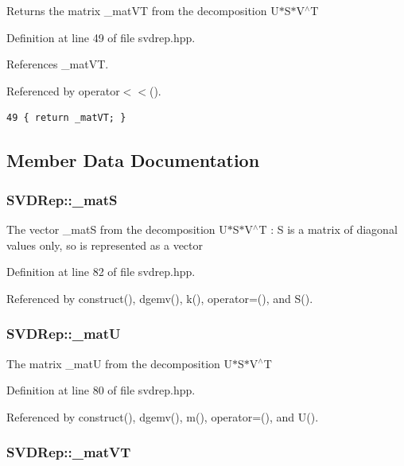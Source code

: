 Returns the matrix \_\-mat\-VT from the decomposition U$\ast$S$\ast$V$^\wedge$T 

Definition at line 49 of file svdrep.hpp.

References \_\-mat\-VT.

Referenced by operator$<$$<$().

\footnotesize\begin{verbatim}49 { return _matVT; }
\end{verbatim}\normalsize 




\subsection{Member Data Documentation}
\subsubsection{ {\bf SVDRep::\_\-mat\-S}\hspace{0.3cm}{\tt  [protected]}}\label{classSVDRep_7eecd1e0af41adfc707b7536c48ede75_7eecd1e0af41adfc707b7536c48ede75}


The vector \_\-mat\-S from the decomposition U$\ast$S$\ast$V$^\wedge$T : S is a matrix of diagonal values only, so is represented as a vector 

Definition at line 82 of file svdrep.hpp.

Referenced by construct(), dgemv(), k(), operator=(), and S().
\subsubsection{ {\bf SVDRep::\_\-mat\-U}\hspace{0.3cm}{\tt  [protected]}}\label{classSVDRep_1b946413f118c1a0b5f2b0ac4cc8c2fd_1b946413f118c1a0b5f2b0ac4cc8c2fd}


The matrix \_\-mat\-U from the decomposition U$\ast$S$\ast$V$^\wedge$T 

Definition at line 80 of file svdrep.hpp.

Referenced by construct(), dgemv(), m(), operator=(), and U().
\subsubsection{ {\bf SVDRep::\_\-mat\-VT}\hspace{0.3cm}{\tt  [protected]}}\label{classSVDRep_2aa0bd21c126d2c9a97f6fcd7939a3ad_2aa0bd21c126d2c9a97f6fcd7939a3ad}


